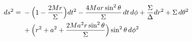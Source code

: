 \documentclass[preview]{standalone}
\begin{document}
\begin{align*}
\special{dvisvgm:raw <g id='unique000'>}\begin{aligned}ds^2 = {}& -\Big(1-\frac{2Mr}{\Sigma}\Big)dt^2-\frac{4Mar\sin^2\theta}{\Sigma}\,dt\,d\phi+\frac{\Sigma}{\Delta}dr^2+\Sigma\,d\theta^2\\&+\Big(r^2+a^2+\frac{2Ma^2r\sin^2\theta}{\Sigma}\Big)\sin^2\theta\,d\phi^2\end{aligned}\special{dvisvgm:raw </g>}
\end{align*}
\end{document}
